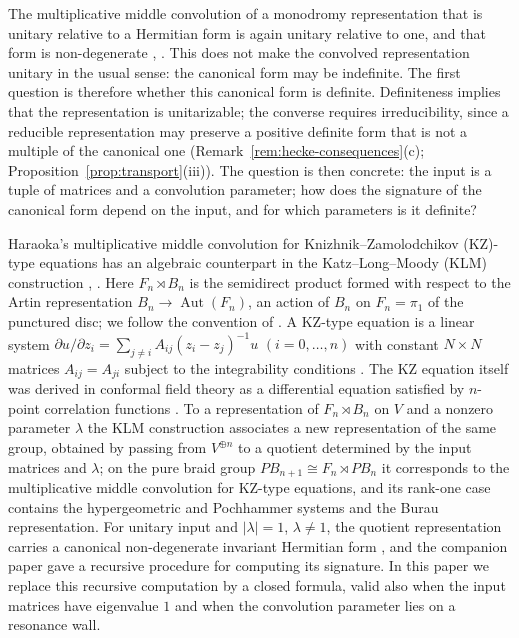 \documentclass[11pt]{article}
\theoremstyle{definition}
\newcommand{\PB}{\mathit{PB}}            %
\begin{document}
The multiplicative middle convolution of a monodromy representation
that is unitary relative to a Hermitian form is again unitary
relative to one, and that form is non-degenerate \cite{Haraoka2020},
\cite{N-KLM}. This does not make the convolved representation
unitary in the usual sense: the canonical form may be indefinite.
The first question is therefore whether this canonical form is
definite. Definiteness implies that the representation is
unitarizable; the converse requires irreducibility, since a
reducible representation may preserve a positive definite form
that is not a multiple of the canonical one
(Remark~\ref{rem:hecke-consequences}(c);
Proposition~\ref{prop:transport}(iii)). The question is then
concrete: the input is a tuple of matrices and a convolution
parameter; how does the signature of the canonical form depend on
the input, and for which parameters is it definite?

Haraoka's multiplicative middle convolution for
Knizhnik--Zamolodchikov (KZ)-type equations \cite{Haraoka2020} has an
algebraic counterpart in the
Katz--Long--Moody (KLM) construction \cite{HN}, \cite{N-KLM}. Here
$F_n\rtimes B_n$ is the semidirect product formed with respect to
the Artin representation $B_n\to\operatorname{Aut}(F_n)$, an action
of $B_n$ on $F_n=\pi_1$ of the punctured disc; we follow the
convention of \cite{N-KLM}. A KZ-type equation is a linear system
$\partial u/\partial z_i=\sum_{j\neq i}A_{ij}(z_i-z_j)^{-1}u$
$(i=0,\dots,n)$ with constant $N\times N$ matrices $A_{ij}=A_{ji}$
subject to the integrability conditions \cite[Def.~13]{N-KLM}. The KZ
equation itself was derived in conformal field theory as a differential equation satisfied by $n$-point
correlation functions \cite{KZ}. To a representation
of $F_n\rtimes B_n$ on $V$ and a nonzero parameter $\lambda$ the KLM
construction associates a new representation of the same group,
obtained by passing from $V^{\oplus n}$ to a quotient determined by
the input matrices and $\lambda$; on the pure braid group
$\PB_{n+1}\cong F_n\rtimes\PB_n$ it corresponds to the
multiplicative middle convolution for KZ-type equations, and its
rank-one case contains
the hypergeometric and Pochhammer systems and the Burau
representation. For unitary input and $|\lambda|=1$,
$\lambda\neq1$, the quotient representation carries a canonical
non-degenerate invariant Hermitian form \cite{N-KLM}, and the
companion paper gave a recursive procedure for computing its
signature. In this paper we
replace this recursive computation by a closed formula, valid also
when the input matrices have eigenvalue $1$ and when the convolution
parameter lies on a resonance wall.
\end{document}
